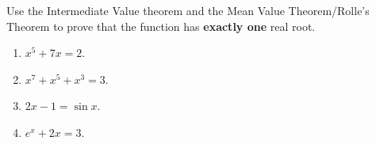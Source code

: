 Use the Intermediate Value theorem and the Mean Value Theorem/Rolle's Theorem to prove that the function has \textbf{exactly one} real root.
\begin{enumerate}[ref={\fcProblemRef}]
\item $x^5+7x=2 $.
\item $x^7+x^5+x^3=3 $.
\item $2x-1=\sin x $.
\item $e^x+2x=3$.
\end{enumerate}
